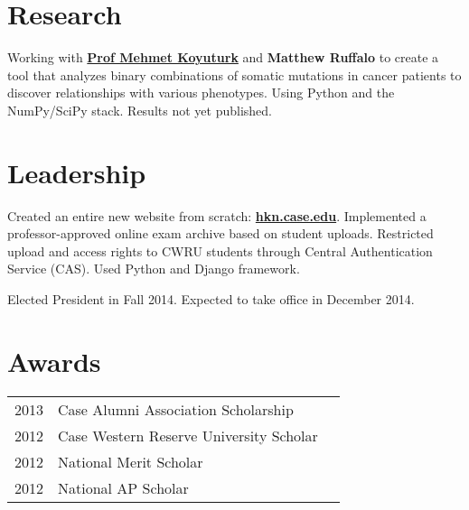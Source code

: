 \documentclass[letterpaper]{deedy-resume} %
\begin{document}
\begin{minipage}[t]{0.66\textwidth}
\section{Research}


 Working with
\textbf{\href{http://engineering.case.edu/profiles/mxk331}{Prof Mehmet
    Koyuturk}} and \textbf{Matthew Ruffalo} to create a tool that analyzes
binary combinations of somatic mutations in cancer patients to discover
relationships with various phenotypes.  Using Python and the NumPy/SciPy stack.
Results not yet published.

\sectionspace %


\section{Leadership}



Created an entire new website from scratch:
\textbf{\href{https://hkn.case.edu}{hkn.case.edu}}.  Implemented a
professor-approved online exam archive based on student uploads.  Restricted
upload and access rights to CWRU students through Central Authentication Service
(CAS).  Used Python and Django framework.

Elected President in Fall 2014.  Expected to take office in December 2014.

\sectionspace %


\section{Awards}

\begin{tabular}{rll}
2013 & Case Alumni Association Scholarship \\
2012 & Case Western Reserve University Scholar \\
2012 & National Merit Scholar \\
2012 & National AP Scholar
\end{tabular}


\end{minipage}
\end{document}
